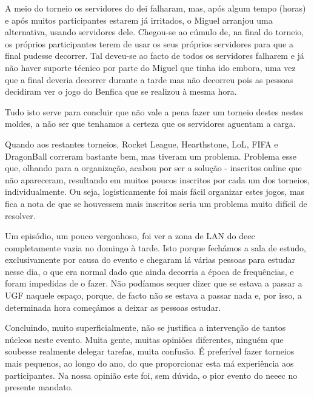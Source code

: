 A meio do torneio os servidores do \acrshort{dei} falharam, mas, após algum tempo (horas) e após muitos participantes estarem já irritados, o Miguel arranjou uma alternativa, usando servidores dele. Chegou-se ao cúmulo de, na final do torneio, os próprios participantes terem de usar os seus próprios servidores para que a final pudesse decorrer. Tal deveu-se ao facto de todos os servidores falharem e já não haver suporte técnico por parte do Miguel que tinha ido embora, uma vez que a final deveria decorrer durante a tarde mas não decorreu pois as pessoas decidiram ver o jogo do Benfica que se realizou à mesma hora.

Tudo isto serve para concluir que não vale a pena fazer um torneio destes nestes moldes, a não ser que tenhamos a certeza que os servidores aguentam a carga.

Quando aos restantes torneios, Rocket League, Hearthstone, LoL, FIFA e DragonBall correram bastante bem, mas tiveram um problema. Problema esse que, olhando para a organização, acabou por ser a solução - inscritos online que não apareceram, resultando em muitos poucos inscritos por cada um dos torneios, individualmente. Ou seja, logisticamente foi mais fácil organizar estes jogos, mas fica a nota de que se houvessem mais inscritos seria um problema muito difícil de resolver. 

Um episódio, um pouco vergonhoso, foi ver a zona de LAN do \acrshort{deec} completamente vazia no domingo à tarde. Isto porque fechámos a sala de estudo, exclusivamente por causa do evento e chegaram lá várias pessoas para estudar nesse dia, o que era normal dado que ainda decorria a época de frequências, e foram impedidas de o fazer. Não podíamos sequer dizer que se estava a passar a UGF naquele espaço, porque, de facto não se estava a passar nada e, por isso, a determinada hora começámos a deixar as pessoas estudar.

Concluindo, muito superficialmente, não se justifica a intervenção de tantos núcleos neste evento.  Muita gente, muitas opiniões diferentes, ninguém que soubesse realmente delegar tarefas, muita confusão. É preferível fazer torneios mais pequenos, ao longo do ano, do que proporcionar esta má experiência aos participantes. Na nossa opinião este foi, sem dúvida, o pior evento do \acrshort{neeec} no presente mandato.


